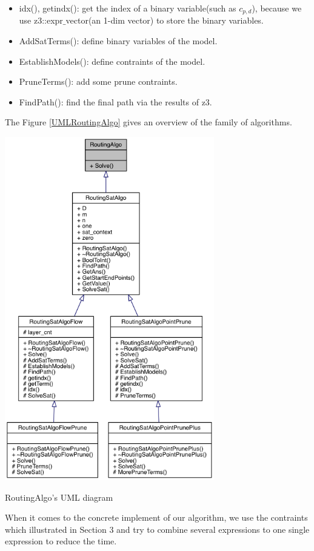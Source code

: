 \documentclass[twocolumn]{article}
\begin{document}
\begin{itemize}
    \item idx(), getindx(): get the index of a binary variable(such as $c_{p,d}$), because we use z3::expr$\_$vector(an 1-dim vector) to store the binary variables.
    \item AddSatTerms(): define binary variables of the model.
    \item EstablishModels(): define contraints of the model.
    \item PruneTerms(): add some prune contraints.
    \item FindPath(): find the final path via the results of z3.
\end{itemize}

The Figure \ref{UMLRoutingAlgo} gives an overview of the family of algorithms.

\begin{center}
\makeatletter
\def\@captype{figure}
\makeatother
\includegraphics [height=15cm]{UMLRoutingAlgo}
\caption{RoutingAlgo's UML diagram}
\label{UMLRoutingAlgo}
\end{center}

When it comes to the concrete implement of our algorithm, we use the contraints which illustrated in Section 3 and try to combine several expressions to one single expression to reduce the time.
\end{document}
